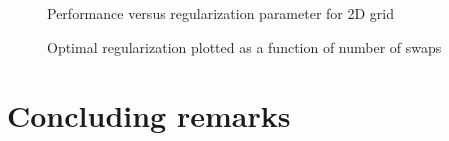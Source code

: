 \documentclass[12pt]{article}
\theoremstyle{plain}
\begin{document}
\begin{figure}
    \centering
    \caption{Performance versus regularization parameter for 2D grid}
\end{figure}

\begin{figure}
    \centering
    \caption{Optimal regularization plotted as a function of number of swaps}
\end{figure}

\section{Concluding remarks}



\end{document}
